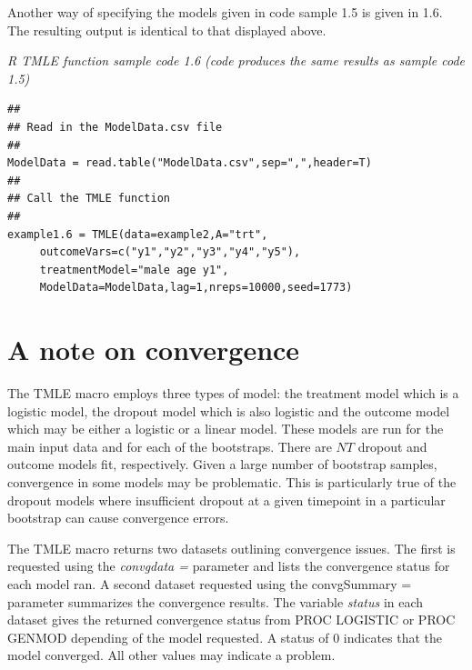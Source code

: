 \documentclass[10pt]{article}
\renewcommand{\baselinestretch}{1.3}
\begin{document}
Another way of specifying the models given in code sample 1.5 is given in 1.6.  The resulting output is identical
to that displayed above.
\vspace{0.1in}

\begin{minipage}{\textwidth}
\renewcommand{\baselinestretch}{1.0}\selectfont%
\begin{minipage}[l]{5.6in}
\normalsize\em%
R TMLE function sample code 1.6 (code produces the same results as sample code 1.5)
\end{minipage}\vspace{-0.08in}
\begin{Verbatim}[baselinestretch=1.0, fontsize=\small, frame=single, commandchars=\\\{\}]
##
## Read in the ModelData.csv file
##
ModelData = read.table("ModelData.csv",sep=",",header=T)
##
## Call the TMLE function
##
example1.6 = TMLE(data=example2,A="trt",
     outcomeVars=c("y1","y2","y3","y4","y5"),
     treatmentModel="male age y1",
     ModelData=ModelData,lag=1,nreps=10000,seed=1773)
\end{Verbatim}
\end{minipage}

\vspace{0.2in}

\section*{A note on convergence}
The TMLE macro employs three types of model:  the treatment model which is a logistic model, the dropout model which is also logistic and the outcome model which may be either a logistic or a linear model.   These models are run for the main input data and for each of the bootstraps.  There are $NT$ dropout and outcome models fit, respectively.  Given a large number of bootstrap samples, convergence in some models may be problematic.  This is particularly true of the dropout models where insufficient dropout at a given timepoint in a particular bootstrap can cause convergence errors.  

The TMLE macro returns two datasets outlining convergence issues.  The first is requested using the  {\em convgdata = } parameter and lists the convergence status for each model ran. A second dataset requested using the {convgSummary = } parameter summarizes the convergence results.  The variable {\em status} in each dataset gives the returned convergence status from PROC LOGISTIC or PROC GENMOD depending of the model requested.  A status of 0 indicates that the model converged.  All other values may indicate a problem.
\end{document}
